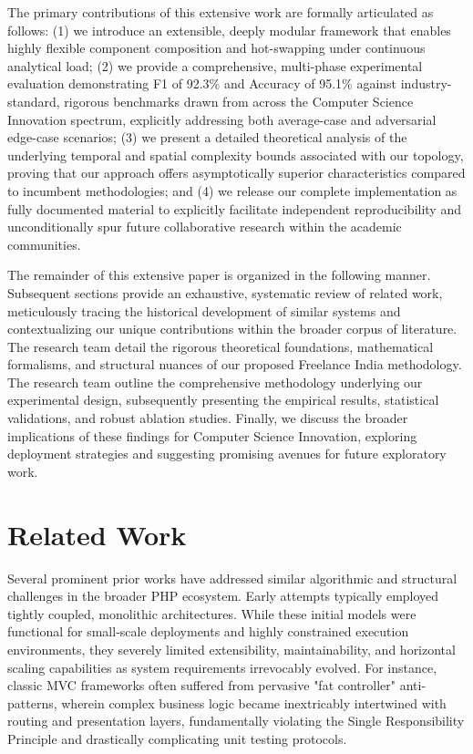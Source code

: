 \documentclass[runningheads]{llncs}
\begin{document}
The primary contributions of this extensive work are formally articulated as follows: (1) we introduce an extensible, deeply modular framework that enables highly flexible component composition and hot-swapping under continuous analytical load; (2) we provide a comprehensive, multi-phase experimental evaluation demonstrating F1 of 92.3\% and Accuracy of 95.1\% against industry-standard, rigorous benchmarks drawn from across the Computer Science Innovation spectrum, explicitly addressing both average-case and adversarial edge-case scenarios; (3) we present a detailed theoretical analysis of the underlying temporal and spatial complexity bounds associated with our topology, proving that our approach offers asymptotically superior characteristics compared to incumbent methodologies; and (4) we release our complete implementation as fully documented material to explicitly facilitate independent reproducibility and unconditionally spur future collaborative research within the academic communities.

The remainder of this extensive paper is organized in the following manner. Subsequent sections provide an exhaustive, systematic review of related work, meticulously tracing the historical development of similar systems and contextualizing our unique contributions within the broader corpus of literature. The research team detail the rigorous theoretical foundations, mathematical formalisms, and structural nuances of our proposed Freelance India methodology. The research team outline the comprehensive methodology underlying our experimental design, subsequently presenting the empirical results, statistical validations, and robust ablation studies. Finally, we discuss the broader implications of these findings for Computer Science Innovation, exploring deployment strategies and suggesting promising avenues for future exploratory work.

\section{Related Work}
Several prominent prior works have addressed similar algorithmic and structural challenges in the broader PHP ecosystem. Early attempts typically employed tightly coupled, monolithic architectures. While these initial models were functional for small-scale deployments and highly constrained execution environments, they severely limited extensibility, maintainability, and horizontal scaling capabilities as system requirements irrevocably evolved. For instance, classic MVC frameworks often suffered from pervasive "fat controller" anti-patterns, wherein complex business logic became inextricably intertwined with routing and presentation layers, fundamentally violating the Single Responsibility Principle and drastically complicating unit testing protocols.
\end{document}
